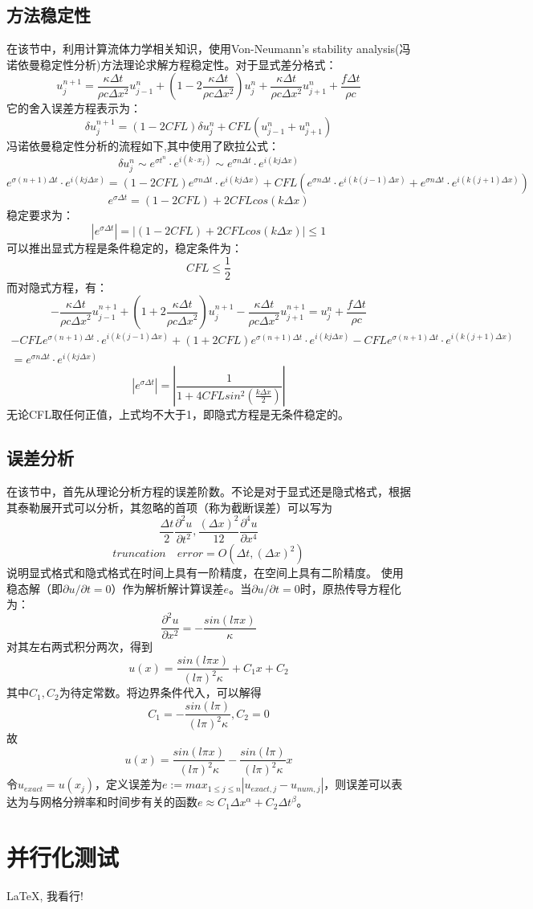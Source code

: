 \documentclass{article}
\begin{document}
		\subsection{方法稳定性}
		在该节中，利用计算流体力学相关知识，使用Von-Neumann's stability analysis(冯诺依曼稳定性分析)方法理论求解方程稳定性。对于显式差分格式：
		$$
		u_j^{n+1}=\frac{\kappa \Delta t}{\rho  c \Delta x^2}u^{n}_{j-1}+(1-2\frac{\kappa \Delta t}{\rho  c \Delta x^2})u^{n}_{j}+\frac{\kappa \Delta t}{\rho  c \Delta x^2}u^{n}_{j+1}+\frac{f \Delta t}{\rho c}
		$$
		它的舍入误差方程表示为：
		$$
		\delta u_j^{n+1}=(1-2CFL)\delta u_j^n + CFL(u^{n}_{j-1}+u^{n}_{j+1})
		$$
		冯诺依曼稳定性分析的流程如下,其中使用了欧拉公式：
		$$
		\delta u_j^n \sim e^{\sigma t^n}\cdot e^{i(k\cdot x_j)} \sim e^{\sigma n\Delta t}\cdot e^{i(kj\Delta x)}
		$$
		$$
		e^{\sigma (n+1)\Delta t}\cdot e^{i(kj\Delta x)}=(1-2CFL)e^{\sigma n\Delta t}\cdot e^{i(kj\Delta x)} + CFL(e^{\sigma n\Delta t}\cdot e^{i(k(j-1)\Delta x)}+e^{\sigma n\Delta t}\cdot e^{i(k(j+1)\Delta x)})
		$$
		$$
		e^{\sigma \Delta t}=(1-2CFL)+2CFLcos(k \Delta x)
		$$
		稳定要求为：
		$$
		|e^{\sigma \Delta t}|=|(1-2CFL)+2CFLcos(k \Delta x)|\leq 1
		$$
		可以推出显式方程是条件稳定的，稳定条件为：
		$$
		CFL \leq \frac{1}{2}
		$$
		而对隐式方程，有：
		$$
		-\frac{\kappa \Delta t}{\rho c {\Delta x}^2}u^{n+1}_{j-1}+(1+2\frac{\kappa \Delta t}{\rho c {\Delta x}^2})u^{n+1}_j-\frac{\kappa \Delta t}{\rho c {\Delta x}^2}u^{n+1}_{j+1}=u^{n}_j+\frac{f\Delta t}{\rho c}
		$$
		$$
		\begin{aligned}
		-CFLe^{\sigma (n+1)\Delta t}\cdot e^{i(k(j-1)\Delta x)}+(1+2CFL)e^{\sigma (n+1)\Delta t}\cdot e^{i(kj\Delta x)}-CFLe^{\sigma (n+1)\Delta t}\cdot e^{i(k(j+1)\Delta x)} \\
		=e^{\sigma n\Delta t}\cdot e^{i(kj\Delta x)}
		\end{aligned}
		$$
		$$
		|e^{\sigma \Delta t}|=|\frac{1}{1+4CFLsin^2(\frac{k\Delta x}{2})}|
		$$
		无论CFL取任何正值，上式均不大于1，即隐式方程是无条件稳定的。
		
		\subsection{误差分析}
		在该节中，首先从理论分析方程的误差阶数。不论是对于显式还是隐式格式，根据其泰勒展开式可以分析，其忽略的首项（称为截断误差）可以写为
		$$
		\frac{\Delta t}{2}\frac{\partial ^2u}{\partial t^2},\frac{(\Delta x)^2}{12}\frac{\partial ^4u}{\partial x^4}
		$$
		$$
		truncation \quad error=O(\Delta t,(\Delta x)^2)
		$$
		说明显式格式和隐式格式在时间上具有一阶精度，在空间上具有二阶精度。
		使用稳态解（即$\partial u /\partial t =0$）作为解析解计算误差$e$。当$\partial u /\partial t =0$时，原热传导方程化为：
		$$
		\frac{\partial^2 u}{\partial x^2}=-\frac{sin(l\pi x)}{\kappa}
		$$
		对其左右两式积分两次，得到
		$$
		u(x)=\frac{sin(l\pi x)}{(l\pi)^2\kappa}+C_1x+C_2
		$$
		其中$C_1,C_2$为待定常数。将边界条件代入，可以解得
		$$
		C_1=-\frac{sin(l\pi)}{(l\pi)^2\kappa},C_2=0
		$$
		故
		$$
		u(x)=\frac{sin(l\pi x)}{(l\pi)^2\kappa}-\frac{sin(l\pi)}{(l\pi)^2\kappa}x
		$$
		令$u_{exact}=u(x_j)$，定义误差为$e:=max_{1\leq j \leq n}|u_{exact,j}-u_{num,j}|$，则误差可以表达为与网格分辨率和时间步有关的函数$e \approx C_1\Delta x^{\alpha}+C_2\Delta t^{\beta}$。
		
		\clearpage
		
		\section{并行化测试}
		
		LaTeX, 我看行!
		
\end{document}
